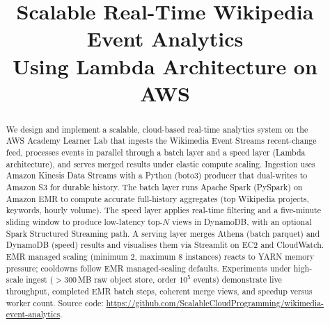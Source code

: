 \documentclass[conference]{IEEEtran}
\begin{document}
\title{Scalable Real-Time Wikipedia Event Analytics\\Using Lambda Architecture on AWS}

\author{
\and
{}
}

\maketitle

\begin{abstract}
We design and implement a scalable, cloud-based real-time analytics system on the AWS Academy Learner Lab that ingests the Wikimedia Event Streams recent-change feed, processes events in parallel through a batch layer and a speed layer (Lambda architecture), and serves merged results under elastic compute scaling. Ingestion uses Amazon Kinesis Data Streams with a Python (boto3) producer that dual-writes to Amazon S3 for durable history. The batch layer runs Apache Spark (PySpark) on Amazon EMR to compute accurate full-history aggregates (top Wikipedia projects, keywords, hourly volume). The speed layer applies real-time filtering and a five-minute sliding window to produce low-latency top-$N$ views in DynamoDB, with an optional Spark Structured Streaming path. A serving layer merges Athena (batch parquet) and DynamoDB (speed) results and visualises them via Streamlit on EC2 and CloudWatch. EMR managed scaling (minimum 2, maximum 8 instances) reacts to YARN memory pressure; cooldowns follow EMR managed-scaling defaults. Experiments under high-scale ingest ($>$300\,MB raw object store, order $10^5$ events) demonstrate live throughput, completed EMR batch steps, coherent merge views, and speedup versus worker count. Source code: \url{https://github.com/ScalableCloudProgramming/wikimedia-event-analytics}.
\end{abstract}
\end{document}
